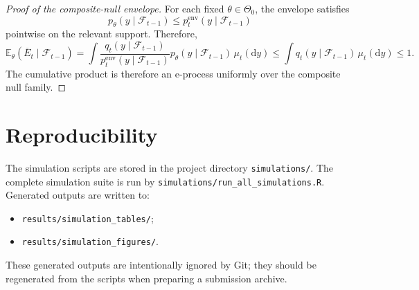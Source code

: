 \documentclass[pdflatex,sn-basic]{sn-jnl}
\newcommand{\E}{\mathbb E}
\newcommand{\1}{\mathbf 1}
\newcommand{\calF}{\mathcal F}
\begin{document}
\begin{proof}[Proof of the composite-null envelope]
For each fixed $\theta\in\Theta_0$, the envelope satisfies
\[
p_\theta(y\mid\calF_{t-1})\leq p_t^{\mathrm{env}}(y\mid\calF_{t-1})
\]
pointwise on the relevant support. Therefore,
\[
\E_\theta(\overline E_t\mid\calF_{t-1})
=\int
\frac{q_t(y\mid\calF_{t-1})}{p_t^{\mathrm{env}}(y\mid\calF_{t-1})}
p_\theta(y\mid\calF_{t-1})\,\mu_t(\mathrm dy)
\leq
\int q_t(y\mid\calF_{t-1})\,\mu_t(\mathrm dy)
\leq1.
\]
The cumulative product is therefore an e-process uniformly over the composite null family.
\end{proof}

\section{Reproducibility}

The simulation scripts are stored in the project directory \texttt{simulations/}. The complete simulation suite is run by \texttt{simulations/run\_all\_simulations.R}. Generated outputs are written to:
\begin{itemize}
\item \texttt{results/simulation\_tables/};
\item \texttt{results/simulation\_figures/}.
\end{itemize}
These generated outputs are intentionally ignored by Git; they should be regenerated from the scripts when preparing a submission archive.
\end{document}
